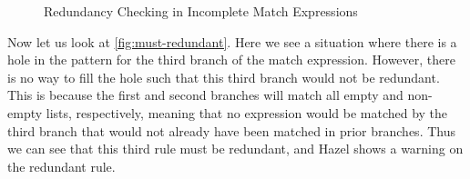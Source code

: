 \begin{figure}[h]
  \centering
    \hfil
  \caption{Redundancy Checking in Incomplete Match Expressions}
  \label{fig:redundancy}
\end{figure}

Now let us look at \autoref{fig:must-redundant}. 
Here we see a situation where there is a hole in the pattern for the third branch of the match expression. 
However, there is no way to fill the hole such that this third branch would not be redundant. 
This is because the first and second branches will match all empty and non-empty lists, respectively, meaning that no expression would be matched by the third branch that would not already have been matched in prior branches.
Thus we can see that this third rule must be redundant, and Hazel shows a warning on the redundant rule.

